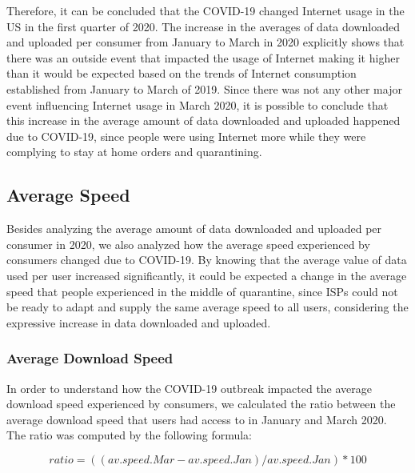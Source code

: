 \documentclass[conference]{IEEEtran}
\begin{document}
Therefore, it can be concluded that the COVID-19 changed Internet usage in the US in the first quarter of 2020. The increase in the averages of data downloaded and uploaded per consumer from January to March in 2020 explicitly shows that there was an outside event that impacted the usage of Internet making it higher than it would be expected based on the trends of Internet consumption established from January to March of 2019. Since there was not any other major event influencing  Internet usage in March 2020, it is possible to conclude that this increase in the average amount of data downloaded and uploaded happened due to COVID-19, since people were using  Internet more while they were complying to stay at home orders and quarantining. 

\subsection{Average Speed}
\label{sec:average-speed}
Besides analyzing the average amount of data downloaded and uploaded per consumer in 2020, we also analyzed how the average speed experienced by consumers changed due to COVID-19. By knowing that the average value of data used per user increased significantly, it could be expected a change in the average speed that people experienced in the middle of quarantine, since ISPs could not be ready to adapt and supply the same average speed to all users, considering the expressive increase in data downloaded and uploaded.

\subsubsection{Average Download Speed}
\label{sec:average-download-speed}

In order to understand how the COVID-19 outbreak impacted the average download speed experienced by consumers, we calculated the ratio between the average download speed that users had access to in January and March 2020. The ratio was computed by the following formula: 

\begin{equation}
ratio= ((av.speed.Mar - av.speed.Jan)/ av.speed.Jan)*100
\end{equation}
\end{document}
